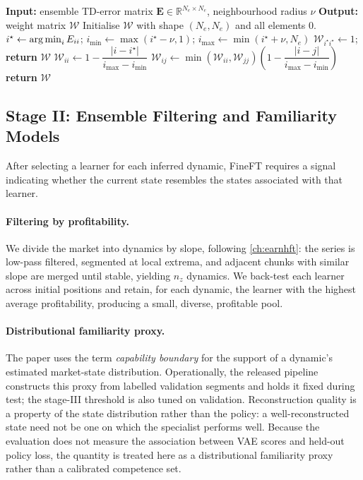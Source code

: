 \begin{algorithm}[!htb]
\caption{Construction of the Weight Matrix}
\label{alg:fineft_weight}
\begin{algorithmic}[1]
\State \textbf{Input:} ensemble TD-error matrix $\mathbf{E}\in\mathbb{R}^{N_e\times N_e}$, neighbourhood radius $\nu$
\State \textbf{Output:} weight matrix $\mathcal{W}$
\State Initialise $\mathcal{W}$ with shape $(N_e,N_e)$ and all elements $0$.
\State $i^\star \gets \operatorname*{arg\,min}_i E_{ii}$; \; $i_{\min}\gets\max(i^\star-\nu,1)$; \; $i_{\max}\gets\min(i^\star+\nu,N_e)$
 
  \State $\mathcal{W}_{i^\star i^\star} \gets 1$; \; \textbf{return} $\mathcal{W}$
\EndIf
{}
  \State $\mathcal{W}_{ii} \gets 1 - \dfrac{|i-i^\star|}{i_{\max}-i_{\min}}$ 
\EndFor
{}
    \State $\mathcal{W}_{ij} \gets \min(\mathcal{W}_{ii},\mathcal{W}_{jj})\left(1 - \dfrac{|i-j|}{i_{\max}-i_{\min}}\right)$ 
  \EndIf
\EndFor
\State \textbf{return} $\mathcal{W}$
\end{algorithmic}
\end{algorithm}

\subsection{Stage II: Ensemble Filtering and Familiarity Models}
\label{sec:fineft_stage2}

After selecting a learner for each inferred dynamic, FineFT requires a signal indicating whether the current state resembles the states associated with that learner.

\paragraph{Filtering by profitability.} We divide the market into dynamics by slope, following \cref{ch:earnhft}: the series is low-pass filtered, segmented at local extrema, and adjacent chunks with similar slope are merged until stable, yielding $n_z$ dynamics. We back-test each learner across initial positions and retain, for each dynamic, the learner with the highest average profitability, producing a small, diverse, profitable pool.

\paragraph{Distributional familiarity proxy.} The paper uses the term \emph{capability boundary} for the support of a dynamic's estimated market-state distribution. Operationally, the released pipeline constructs this proxy from labelled validation segments and holds it fixed during test; the stage-III threshold is also tuned on validation. Reconstruction quality is a property of the state distribution rather than the policy: a well-reconstructed state need not be one on which the specialist performs well. Because the evaluation does not measure the association between VAE scores and held-out policy loss, the quantity is treated here as a distributional familiarity proxy rather than a calibrated competence set.


